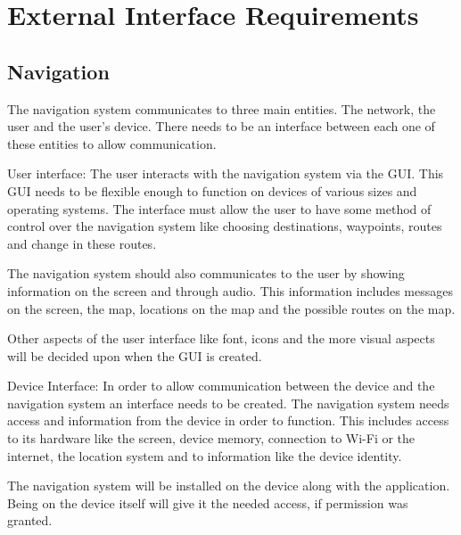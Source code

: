 \documentclass[runningheads,a4paper]{article}
\begin{document}



\begingroup



\tableofcontents


\endgroup

\newpage




\section{External Interface Requirements}
\subsection {Navigation}
The navigation system communicates to three main entities. The network, the user and the user’s device. There needs to be an interface 
between each one of these entities to allow communication. 

User interface: 
The user interacts with the navigation system via the GUI. This GUI needs to be flexible enough to function on devices of various sizes 
and operating systems. The interface must allow the user to have some method of control over the navigation system like choosing 
destinations, waypoints, routes and change in these routes. 

The navigation system should also communicates to the user by showing information on the screen and through audio. This information
includes messages on the screen, the map, locations on the map and the possible routes on the map.

Other aspects of the user interface like font, icons and the more visual aspects will be decided upon when the GUI is created.

Device Interface:
In order to allow communication between the device and the navigation system an interface needs to be created. The navigation system 
needs access and information from the device in order to function. This includes access to its hardware like the screen, 
device memory, connection to Wi-Fi or the internet, the location system and to information like the device identity. 

The navigation system will be installed on the device along with the application. Being on the device itself will give it the needed
access, if permission was granted. 
\end{document}
